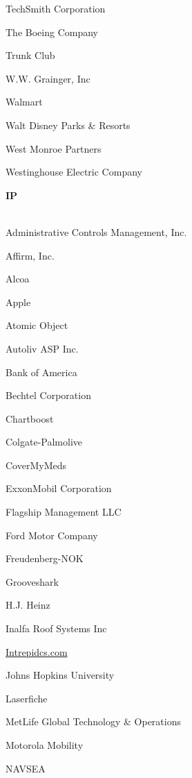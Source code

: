 \documentclass[twoside]{article}
\begin{document}
\begin{center}
\begin{multicols}{5}
\begin{FlushLeft}
\begin{compactitem}
\item TechSmith Corporation
\item The Boeing Company
\item Trunk Club
\item W.W. Grainger, Inc
\item Walmart
\item Walt Disney Parks \& Resorts
\item West Monroe Partners
\item Westinghouse Electric Company
\end{compactitem}
        \end{FlushLeft}
        \vspace{1em}
        {\fontsize{14}{16}\selectfont \bf IP}\\
        \vspace{-1em}
        ~\hrulefill~
        \vspace{-.9em}
        \begin{FlushLeft}
        \begin{compactitem}
        \item Administrative Controls Management, Inc.
\item Affirm, Inc.
\item Alcoa
\item Apple
\item Atomic Object
\item Autoliv ASP Inc.
\item Bank of America
\item Bechtel Corporation
\item Chartboost
\item Colgate-Palmolive
\item CoverMyMeds
\item ExxonMobil Corporation
\item Flagship Management LLC
\item Ford Motor Company
\item Freudenberg-NOK
\item Grooveshark
\item H.J. Heinz
\item Inalfa Roof Systems Inc
\item \url{Intrepidcs.com}
\item Johns Hopkins University
\item Laserfiche
\item MetLife Global Technology \& Operations
\item Motorola Mobility
\item NAVSEA

\end{compactitem}
\end{FlushLeft}
\end{multicols}
\end{center}
\end{document}
